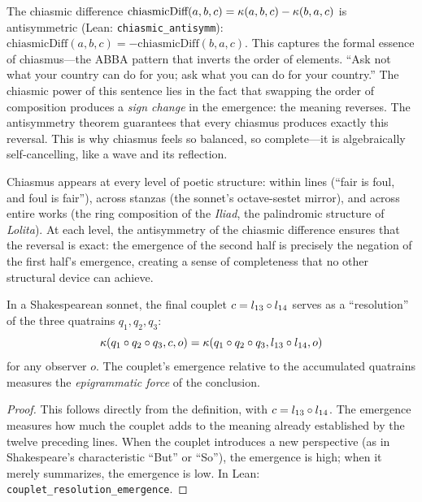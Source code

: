 \begin{remark}
\label{rem:chiasmus}
The chiasmic difference $\text{chiasmicDiff}(a, b, c) = \kappa(a, b, c) - \kappa(b, a, c)$ is antisymmetric (Lean: \texttt{chiasmic\_antisymm}): $\text{chiasmicDiff}(a, b, c) = -\text{chiasmicDiff}(b, a, c)$.  This captures the formal essence of chiasmus---the ABBA pattern that inverts the order of elements.  ``Ask not what your country can do for you; ask what you can do for your country.''  The chiasmic power of this sentence lies in the fact that swapping the order of composition produces a \emph{sign change} in the emergence: the meaning reverses.  The antisymmetry theorem guarantees that every chiasmus produces exactly this reversal.  This is why chiasmus feels so balanced, so complete---it is algebraically self-cancelling, like a wave and its reflection.

Chiasmus appears at every level of poetic structure: within lines (``fair is foul, and foul is fair''), across stanzas (the sonnet's octave-sestet mirror), and across entire works (the ring composition of the \textit{Iliad}, the palindromic structure of \textit{Lolita}).  At each level, the antisymmetry of the chiasmic difference ensures that the reversal is exact: the emergence of the second half is precisely the negation of the first half's emergence, creating a sense of completeness that no other structural device can achieve.
\end{remark}

\begin{theorem}
\label{thm:couplet-resolution}
In a Shakespearean sonnet, the final couplet $c = l_{13} \circ l_{14}$ serves as a ``resolution'' of the three quatrains $q_1, q_2, q_3$:
\[
  \kappa(q_1 \circ q_2 \circ q_3, c, o) = \kappa(q_1 \circ q_2 \circ q_3, l_{13} \circ l_{14}, o)
\]
for any observer $o$.  The couplet's emergence relative to the accumulated quatrains measures the \emph{epigrammatic force} of the conclusion.
\end{theorem}

\begin{proof}
This follows directly from the definition, with $c = l_{13} \circ l_{14}$.  The emergence measures how much the couplet adds to the meaning already established by the twelve preceding lines.  When the couplet introduces a new perspective (as in Shakespeare's characteristic ``But'' or ``So''), the emergence is high; when it merely summarizes, the emergence is low.  In Lean: \texttt{couplet\_resolution\_emergence}.
\end{proof}

